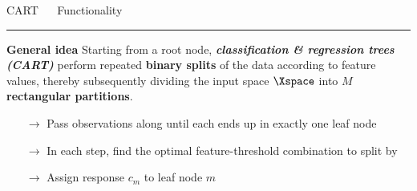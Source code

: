 \documentclass[11pt,compress,t,notes=noshow, xcolor=table]{beamer}
\begin{document}
\LARGE
\begin{frame}{\textcolor{gray!80}{CART} ~~ Functionality}
\normalsize
\vspace{-0.5cm}
\noindent \textcolor{gray!80}{\rule{\textwidth}{1pt}}

\scriptsize

\textbf{\textcolor{gray!80}{General idea}} {}{} Starting from a root node, 
\textit{\textbf{classification \& regression trees (CART)}} 
perform repeated \textbf{binary splits} of the data according to feature values, 
thereby subsequently dividing the input space $\Xspace$ into $M$ 
\textbf{rectangular partitions}.

\begin{itemize}
  \item [$\rightarrow$] Pass observations along until each ends up in exactly 
  one leaf node
  \item [$\rightarrow$] In each step, find the optimal feature-threshold
  combination to split by
  \item [$\rightarrow$] Assign response $c_m$ to leaf node $m$
\end{itemize}

\vspace{0.1cm}


\end{frame}
\end{document}
